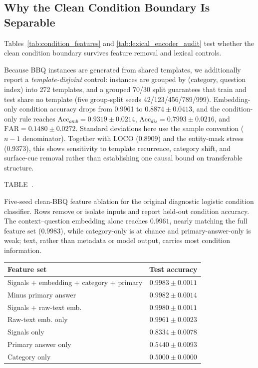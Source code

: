 \documentclass{ieeeaccess}
\newcommand{\accamb}{\mathrm{Acc}_{amb}}
\newcommand{\accdis}{\mathrm{Acc}_{dis}}
\newcommand{\far}{\mathrm{FAR}}
\newcommand{\inlinetablecaption}[2]{%
  \par\vspace{0.62\baselineskip}\noindent
  \refstepcounter{table}\label{#1}%
  {\color{accessblue}\tablecapheadfont TABLE~\thetable.\ }%
  {\tablecapfont #2\par}%
  \vspace{6pt}%
}
\begin{document}
\subsection{Why the Clean Condition Boundary Is Separable}
\label{sec:condition_audit}
Tables~\ref{tab:condition_features} and \ref{tab:lexical_encoder_audit} test whether the clean condition boundary survives feature removal and lexical controls.

Because BBQ instances are generated from shared templates, we additionally report a \emph{template-disjoint} control: instances are grouped by (category, question index) into 272 templates, and a grouped 70/30 split guarantees that train and test share no template (five group-split seeds 42/123/456/789/999). Embedding-only condition accuracy drops from 0.9961 to $0.8874\pm0.0413$, and the condition-only rule reaches $\accamb=0.9319\pm0.0214$, $\accdis=0.7993\pm0.0216$, and $\far=0.1480\pm0.0272$. Standard deviations here use the sample convention ($n-1$ denominator). Together with LOCO (0.8909) and the entity-mask stress (0.9373), this shows sensitivity to template recurrence, category shift, and surface-cue removal rather than establishing one causal bound on transferable structure.

\noindent\begin{minipage}{\columnwidth}
\inlinetablecaption{tab:condition_features}{Five-seed clean-BBQ feature ablation for the original diagnostic logistic condition classifier. Rows remove or isolate inputs and report held-out condition accuracy. The context--question embedding alone reaches $0.9961$, nearly matching the full feature set ($0.9983$), while category-only is at chance and primary-answer-only is weak; text, rather than metadata or model output, carries most condition information.}
\begin{center}
\scriptsize
\setlength{\tabcolsep}{2.5pt}
\renewcommand{\arraystretch}{1.04}
\begin{tabular}{@{}lc@{}}
\toprule
Feature set & Test accuracy \\
\midrule
Signals + embedding + category + primary & $0.9983\pm0.0011$ \\
Minus primary answer & $0.9982\pm0.0014$ \\
Signals + raw-text emb. & $0.9980\pm0.0011$ \\
Raw-text emb. only & $0.9961\pm0.0023$ \\
Signals only & $0.8334\pm0.0078$ \\
Primary answer only & $0.5440\pm0.0093$ \\
Category only & $0.5000\pm0.0000$ \\
\bottomrule
\end{tabular}
\end{center}
\end{minipage}
\par\vspace{0.5\baselineskip}
\end{document}
